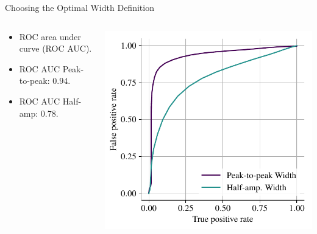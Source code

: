 \documentclass[aspectratio=169]{beamer}
\begin{document}
\begin{frame}{Choosing the Optimal Width Definition}
    \begin{columns}
        \begin{column}{0.48\textwidth}
            \begin{itemize}
                \item ROC area under curve (ROC AUC).
                \item ROC AUC Peak-to-peak: $0.94$.
                \item ROC AUC Half-amp: $0.78$.
            \end{itemize}
        \end{column}
        \begin{column}{0.48\textwidth}
            \begin{center}
                \includegraphics[width=\textwidth]{images/roc_curves.pdf}
            \end{center}
        \end{column}
    \end{columns}
\end{frame}
\end{document}
